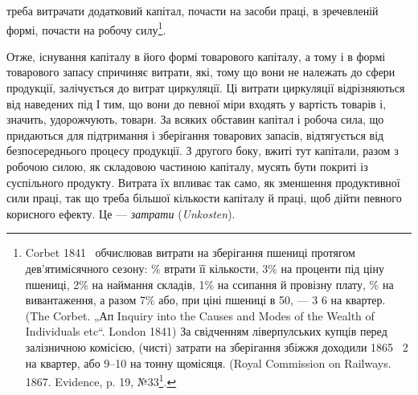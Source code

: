\parcont{}  %
треба витрачати додатковий капітал, почасти на засоби праці, в зречевленій
формі, почасти на робочу силу\footnote{
Corbet 1841~ обчислював витрати на зберігання пшениці протягом дев'ятимісячного
сезону: \% втрати її кількости, 3\% на проценти під ціну пшениці,
2\% на наймання складів, 1\% на ссипання й провізну плату, \% на вивантаження,
а разом 7\% або, при ціні пшениці в 50, — 3 6 на
квартер. (The Corbet. „Ап Inquiry into the Causes and Modes of the Wealth of
Individuals etc“. London 1841) За свідченням ліверпулських купців перед залізничною
комісією, (чисті) затрати на зберігання збіжжя доходили 1865~ 2
на квартер, або 9--10 на тонну щомісяця. (Royal Commission on Railways.
1867. Evidence, p. 19, №33\footnote*{
Точна назва цього видання така: „Reports from commissioners Session“,
1867, vol. XXXVIII; зазначене місце є в другому відділі першої частини, що має
назву: „Royal Commission on Railways. Minutes of Evidence taken before the commissioners
March 1855 to Mev 1866. Presented to both Houses of Parlament by
command of her Majesty“. London, printed 1867. }.
}.

Отже, існування капіталу в його формі товарового капіталу, а тому
і в формі товарового запасу спричиняє витрати, які, тому що вони не належать
до сфери продукції, залічується до витрат циркуляції. Ці витрати
циркуляції відрізняються від наведених під І тим, що вони до певної
міри входять у вартість товарів і, значить, удорожчують, товари. За всяких
обставин капітал і робоча сила, що придаються для підтримання і
зберігання товарових запасів, відтягується від безпосереднього процесу
продукції. З другого боку, вжиті тут капітали, разом з робочою силою,
як складовою частиною капіталу, мусять бути покриті із суспільного
продукту. Витрата їх впливає так само, як зменшення продуктивної сили
праці, так що треба більшої кількости капіталу й праці, щоб дійти певного
корисного ефекту. Це — \emph{затрати} (\emph{Unkosten}).

